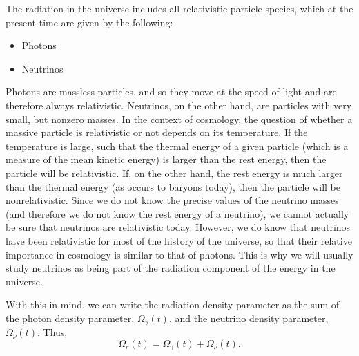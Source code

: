 The radiation in the universe includes all relativistic particle species, which at the present time are given by the following:
\begin{itemize}
\item Photons
\item Neutrinos
\end{itemize}
Photons are massless particles, and so they move at the speed of light and are therefore always relativistic. Neutrinos, on the other hand, are particles with very small, but nonzero masses. In the context of cosmology, the question of whether a massive particle is relativistic or not depends on its temperature. If the temperature is large, such that the thermal energy of a given particle (which is a measure of the mean kinetic energy) is larger than the rest energy, then the particle will be relativistic. If, on the other hand, the rest energy is much larger than the thermal energy (as occurs to baryons today), then the particle will be nonrelativistic. Since we do not know the precise values of the neutrino masses (and therefore we do not know the rest energy of a neutrino), we cannot actually be sure that neutrinos are relativistic today. However, we do know that neutrinos have been relativistic for most of the history of the universe, so that their relative importance in cosmology is similar to that of 
photons. This is why we will usually study neutrinos as being part of the radiation component of the energy in the universe.

With this in mind, we can write the radiation density parameter as the sum of the photon density parameter, $\Omega_{\gamma}(t)$, and the neutrino density parameter, $\Omega_{\nu}(t)$. Thus,
\begin{equation}
\Omega_r(t)=\Omega_{\gamma}(t)+\Omega_{\nu}(t).
\end{equation}

